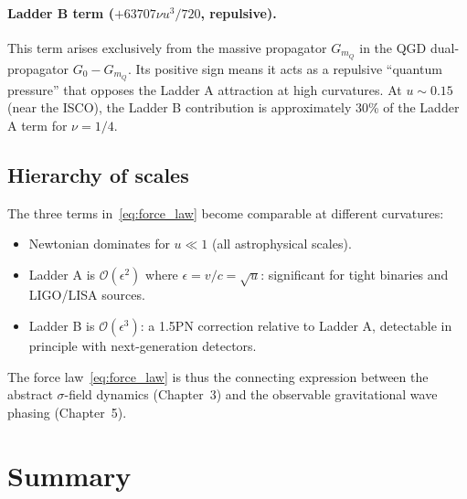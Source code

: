 \documentclass[11pt,a4paper]{article}
\theoremstyle{plain}
\theoremstyle{definition}
\theoremstyle{remark}
\newcommand{\mQ}{m_Q}
\begin{document}
\paragraph{Ladder B term ($+63707\nu u^3/720$, repulsive).}
This term arises exclusively from the massive propagator $G_{\mQ}$ in the QGD
dual-propagator $G_0 - G_{\mQ}$.  Its positive sign means it acts as a repulsive
``quantum pressure'' that opposes the Ladder A attraction at high curvatures.  At
$u \sim 0.15$ (near the ISCO), the Ladder B contribution is approximately 30\%
of the Ladder A term for $\nu = 1/4$.

\subsection{Hierarchy of scales}

The three terms in~\eqref{eq:force_law} become comparable at different curvatures:

\begin{itemize}[nosep]
  \item Newtonian dominates for $u \ll 1$ (all astrophysical scales).
  \item Ladder A is $\mathcal{O}(\epsilon^2)$ where $\epsilon = v/c = \sqrt{u}$:
    significant for tight binaries and LIGO/LISA sources.
  \item Ladder B is $\mathcal{O}(\epsilon^3)$: a 1.5PN correction relative to
    Ladder A, detectable in principle with next-generation detectors.
\end{itemize}

The force law~\eqref{eq:force_law} is thus the connecting expression between the
abstract $\sigma$-field dynamics (Chapter~3) and the observable gravitational wave
phasing (Chapter~5).

\section{Summary}
\label{sec:summary}
\end{document}
